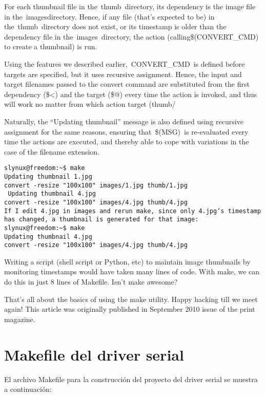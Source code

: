 \documentclass[12pt]{article}
\begin{document}
For each thumbnail file in the thumb directory, its dependency is the image file in the imagesdirectory. Hence, if any file (that’s expected to be) in the thumb directory does not exist, or its timestamp is older than the dependency file in the images directory, the action (calling\$(CONVERT\_CMD) to create a thumbnail) is run.

Using the features we described earlier, CONVERT\_CMD is defined before targets are specified, but it uses recursive assignment. Hence, the input and target filenames passed to the convert command are substituted from the first dependency (\$<) and the target (\$@) every time the action is invoked, and thus will work no matter from which action target (thumb/%

Naturally, the “Updating thumbnail” message is also defined using recursive assignment for the same reasons, ensuring that \$(MSG) is re-evaluated every time the actions are executed, and thereby able to cope with variations in the case of the filename extension.

\begin{verbatim}
slynux@freedom:~$ make
Updating thumbnail 1.jpg
convert -resize "100x100" images/1.jpg thumb/1.jpg
 Updating thumbnail 4.jpg
convert -resize "100x100" images/4.jpg thumb/4.jpg
If I edit 4.jpg in images and rerun make, since only 4.jpg‘s timestamp has changed, a thumbnail is generated for that image:
slynux@freedom:~$ make
Updating thumbnail 4.jpg
convert -resize "100x100" images/4.jpg thumb/4.jpg
\end{verbatim}

Writing a script (shell script or Python, etc) to maintain image thumbnails by monitoring timestamps would have taken many lines of code. With make, we can do this in just 8 lines of Makefile. Isn’t make awesome?

That’s all about the basics of using the make utility. Happy hacking till we meet again!
This article was originally published in September 2010 issue of the print magazine.



\section*{Makefile del driver serial}

El archivo Makefile para la construcción del proyecto del driver serial
se muestra a continuación:
\end{document}
